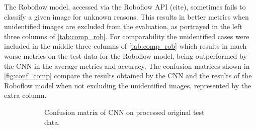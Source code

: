 \noindent 
The Roboflow model, accessed via the Roboflow API (cite), sometimes fails to classify a given image for unknown reasons. This results in better metrics when unidentified images are excluded from the evaluation, as portrayed in the left three columns of \autoref{tab:comp_rob}. For comparability the unidentified cases were included in the middle three columns of \autoref{tab:comp_rob} which results in much worse metrics on the test data for the Roboflow model, being outperformed by the CNN in the average metrics and accuracy. 
The confusion matrices shown in \autoref{fig:conf_comp} compare the results obtained by the CNN and the results of the Roboflow model when not excluding the unidentified images, represented by the extra column.
\begin{figure}[H]
    \centering
    \begin{subfigure}{0.49\textwidth}
        \centering
        \caption{Confusion matrix of CNN on processed original test data.}
    \end{subfigure}
    \hfill
    \begin{subfigure}{0.49\textwidth}
        \centering

\end{subfigure}
\end{figure}
